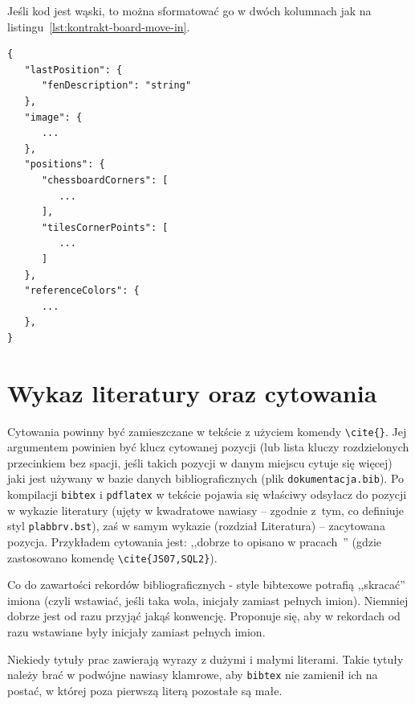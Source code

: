 Jeśli kod jest wąski, to można sformatować go w dwóch kolumnach jak na listingu~\ref{lst:kontrakt-board-move-in}.

\begingroup 
{}
\setlength{}%
\begin{lstlisting}[style=json-style, multicols=2, label=lst:kontrakt-board-move-in]
{
   "lastPosition": {
      "fenDescription": "string"
   },
   "image": {
      ...
   },
   "positions": {
      "chessboardCorners": [
         ...
      ],
      "tilesCornerPoints": [
         ...
      ]
   },
   "referenceColors": {
      ...
   },
}
\end{lstlisting}
\vspace{6pt plus 2pt}
\endgroup

\section{Wykaz literatury oraz cytowania}
\label{sec:literatura}
Cytowania powinny być zamieszczane w tekście z użyciem komendy \verb+\cite{}+. Jej argumentem powinien być klucz cytowanej pozycji (lub lista kluczy  rozdzielonych przecinkiem bez spacji, jeśli takich pozycji w danym miejscu cytuje się więcej) jaki jest używany w bazie danych bibliograficznych (plik \texttt{dokumentacja.bib}). Po kompilacji \texttt{bibtex} i \texttt{pdflatex} w tekście pojawia się właściwy odsyłacz do pozycji w wykazie literatury (ujęty w kwadratowe nawiasy -- zgodnie z~tym, co definiuje styl \texttt{plabbrv.bst}), zaś w samym wykazie (rozdział Literatura) -- zacytowana pozycja. Przykładem cytowania jest: ,,dobrze to opisano w pracach~\cite{JS07,SQL2}'' (gdzie zastosowano komendę \verb?\cite{JS07,SQL2}?).

Co do zawartości rekordów bibliograficznych - style bibtexowe potrafią ,,skracać'' imiona (czyli wstawiać, jeśli taka wola, inicjały zamiast pełnych imion). Niemniej dobrze jest od razu przyjąć jakąś konwencję. Proponuje się, aby w rekordach od razu wstawiane były inicjały zamiast pełnych imion.

Niekiedy tytuły prac zawierają wyrazy z dużymi i małymi literami. Takie tytuły należy brać w podwójne nawiasy klamrowe, aby \texttt{bibtex} nie zamienił ich na postać, w której poza pierwszą literą pozostałe są małe.

